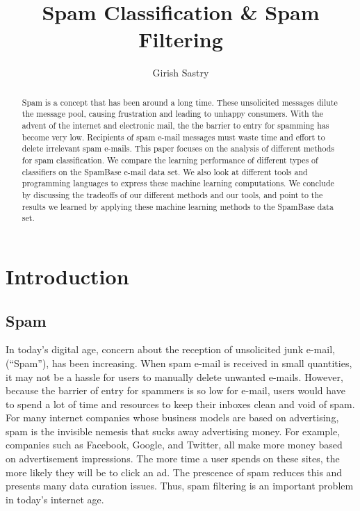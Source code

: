 \documentclass[a4paper,10pt]{article}
\title{Spam Classification \& Spam Filtering}
\author{Girish Sastry}
\begin{document}
\maketitle

\begin{abstract}

Spam is a concept that has been around a long time. These unsolicited messages dilute the message pool, causing
frustration and leading to unhappy consumers. With the advent of the internet and electronic mail, the the barrier
to entry for spamming has become very low. Recipients of spam e-mail messages must waste time and effort to delete
irrelevant spam e-mails. This paper focuses on the analysis of different methods for spam classification. We compare
the learning performance of different types of classifiers on the SpamBase e-mail data set. We also look at different tools and programming languages
to express these machine learning computations. We conclude by discussing the tradeoffs of our different methods and
our tools, and point to the results we learned by applying these machine learning methods to the SpamBase data set.

\end{abstract}

\section{Introduction}
\subsection{Spam}

In today's digital age, concern about the reception of unsolicited junk e-mail, (``Spam''), has been increasing.
When spam e-mail is received in small quantities, it may not be a hassle for users to manually delete unwanted
e-mails. However, because the barrier of entry for spammers is so low for e-mail, users would have to spend a lot
of time and resources to keep their inboxes clean and void of spam. For many internet companies whose business
models are based on advertising, spam is the invisible nemesis that sucks away advertising money. For example, 
companies such as Facebook, Google, and Twitter, all make more money based on advertisement impressions. The
more time a user spends on these sites, the more likely they will be to click an ad. The prescence of spam 
reduces this and presents many data curation issues. Thus, spam filtering is an important problem in today's
internet age.
\end{document}
